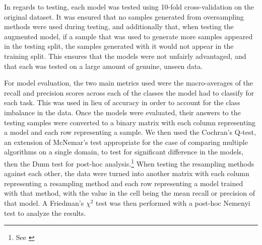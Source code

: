 \documentclass[runningheads]{llncs}
\begin{document}
In regards to testing, each model was tested using 10-fold cross-validation on the original dataset. It was ensured that no samples generated from oversampling methods were used during testing, and additionally that, when testing the augmented model, if a sample that was used to generate more samples appeared in the testing split, the samples generated with it would not appear in the training split. This ensures that the models were not unfairly advantaged, and that each was tested on a large amount of genuine, unseen data.

For model evaluation, the two main metrics used were the macro-averages of the recall and precision scores across each of the classes the model had to classify for each task. This was used in lieu of accuracy in order to account for the class imbalance in the data. Once the models were evaluated, their answers to the testing samples were converted to a binary matrix with each column representing a model and each row representing a sample. We then used the Cochran's Q-test, an extension of McNemar's test appropriate for the case of comparing multiple algorithms on a single domain, to test for significant difference in the models, then the Dunn test for post-hoc analysis.\footnote{See \cite{boukouvalas}} When testing the resampling methods against each other, the data were turned into another matrix with each column representing a resampling method and each row representing a model trained with that method, with the value in the cell being the mean recall or precision of that model. A Friedman's $\chi^2$ test was then performed with a post-hoc Nemenyi test to analyze the results.
\end{document}
